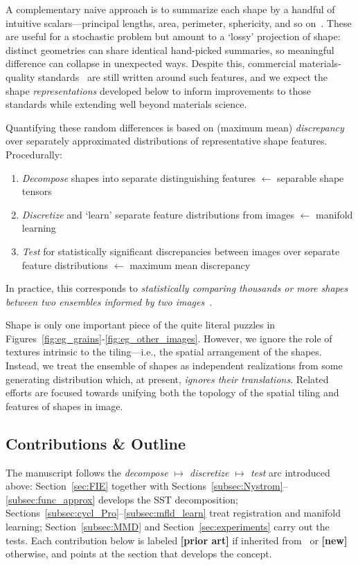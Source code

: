 \documentclass[pdflatex,iicol]{sn-jnl}%
\theoremstyle{thmstyleone}%
\theoremstyle{thmstyletwo}%
\theoremstyle{thmstylethree}%
\begin{document}
A complementary naive approach is to summarize each shape by a handful of intuitive scalars---principal lengths, area, perimeter, sphericity, and so on~\cite{stoudt2020location, ASTM_E562, ASTM_E930, ASTM_E112}. These are useful for a stochastic problem but amount to a `lossy' projection of shape: distinct geometries can share identical hand-picked summaries, so meaningful difference can collapse in unexpected ways. Despite this, commercial materials-quality standards~\cite{kazakov2019astm} are still written around such features, and we expect the shape \textit{representations} developed below to inform improvements to those standards while extending well beyond materials science.

Quantifying these random differences is based on (maximum mean) \emph{discrepancy}~\cite{gretton2012kernel} over separately approximated distributions of representative shape features. Procedurally:
\begin{enumerate}[label=\roman*)]
    \item \textit{Decompose} shapes into separate distinguishing features $\leftarrow$ separable shape tensors
    \item \textit{Discretize} and `learn' separate feature distributions from images $\leftarrow$ manifold learning
    \item \textit{Test} for statistically significant discrepancies between images over separate feature distributions $\leftarrow$ maximum mean discrepancy
\end{enumerate}
In practice, this corresponds to \emph{statistically comparing thousands or more shapes between two ensembles informed by two images}~\cite{gretton2012kernel}.

Shape is only one important piece of the quite literal puzzles in Figures~\ref{fig:eg_grains}-\ref{fig:eg_other_images}. However, we ignore the role of textures intrinsic to the tiling---i.e., the spatial arrangement of the shapes. Instead, we treat the ensemble of shapes as independent realizations from some generating distribution which, at present, \textit{ignores their translations}. Related efforts are focused towards unifying both the topology of the spatial tiling and features of shapes in image.

\subsection{Contributions \& Outline}
The manuscript follows the \emph{decompose $\mapsto$ discretize $\mapsto$ test} arc introduced above: Section~\ref{sec:FIE} together with Sections~\ref{subsec:Nystrom}--\ref{subsec:func_approx} develops the SST decomposition; Sections~\ref{subsec:cycl_Pro}--\ref{subsec:mfld_learn} treat registration and manifold learning; Section~\ref{subsec:MMD} and Section~\ref{sec:experiments} carry out the tests. Each contribution below is labeled \textbf{[prior art]} if inherited from~\cite{grey2023separable} or \textbf{[new]} otherwise, and points at the section that develops the concept.
\end{document}
